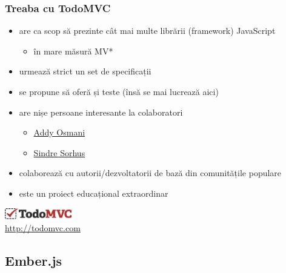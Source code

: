 \documentclass[compress]{beamer}
\begin{document}
\begin{frame}

\frametitle{Treaba cu TodoMVC}

\begin{itemize}[<+->]
  \item are ca scop să prezinte cât mai multe librării (framework) JavaScript
    \begin{itemize}[<+->]
      \item în mare măsură MV*
    \end{itemize}
  \item urmează strict un set de specificații
  \item se propune să oferă și teste (însă se mai lucrează aici)
  \item are nișe persoane interesante la colaboratori
    \begin{itemize}[<+->]
      \item \href{https://twitter.com/addyosmani}{Addy Osmani}
      \item \href{https://twitter.com/sindresorhus}{Sindre Sorhus}
    \end{itemize}
  \item colaborează cu autorii/dezvoltatorii de bază din comunitățile populare
  \item este un proiect educațional extraordinar
\end{itemize}

\begin{flushright}
  \colorbox{white}{\includegraphics[height=0.5cm]{todomvc.png}}
  \\
  \tiny \url{http://todomvc.com}
\end{flushright}

\end{frame}

\subsection{Ember.js}
\end{document}
